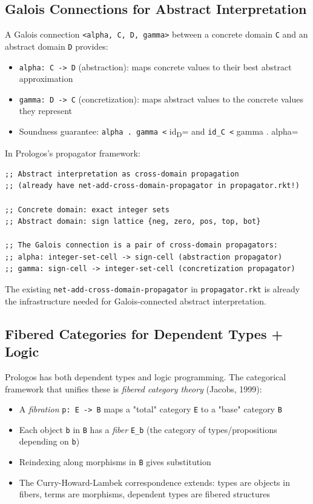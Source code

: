 \documentclass[11pt]{article}
\begin{document}
\subsection{Galois Connections for Abstract Interpretation}
\label{sec:org058130a}

A Galois connection \texttt{<alpha, C, D, gamma>} between a concrete domain \texttt{C} and an
abstract domain \texttt{D} provides:

\begin{itemize}
\item \texttt{alpha: C -> D} (abstraction): maps concrete values to their best abstract approximation
\item \texttt{gamma: D -> C} (concretization): maps abstract values to the concrete values they represent
\item Soundness guarantee: \texttt{alpha . gamma <} id\textsubscript{D}= and \texttt{id\_C <} gamma . alpha=
\end{itemize}

In Prologos's propagator framework:

\begin{verbatim}
;; Abstract interpretation as cross-domain propagation
;; (already have net-add-cross-domain-propagator in propagator.rkt!)

;; Concrete domain: exact integer sets
;; Abstract domain: sign lattice {neg, zero, pos, top, bot}

;; The Galois connection is a pair of cross-domain propagators:
;; alpha: integer-set-cell -> sign-cell (abstraction propagator)
;; gamma: sign-cell -> integer-set-cell (concretization propagator)
\end{verbatim}

The existing \texttt{net-add-cross-domain-propagator} in \texttt{propagator.rkt} is already
the infrastructure needed for Galois-connected abstract interpretation.
\subsection{Fibered Categories for Dependent Types + Logic}
\label{sec:org91f88e2}

Prologos has both dependent types and logic programming. The categorical
framework that unifies these is \emph{fibered category theory} (Jacobs, 1999):

\begin{itemize}
\item A \emph{fibration} \texttt{p: E -> B} maps a "total" category \texttt{E} to a "base" category \texttt{B}
\item Each object \texttt{b} in \texttt{B} has a \emph{fiber} \texttt{E\_b} (the category of types/propositions
depending on \texttt{b})
\item Reindexing along morphisms in \texttt{B} gives substitution
\item The Curry-Howard-Lambek correspondence extends: types are objects in fibers,
terms are morphisms, dependent types are fibered structures
\end{itemize}
\end{document}
